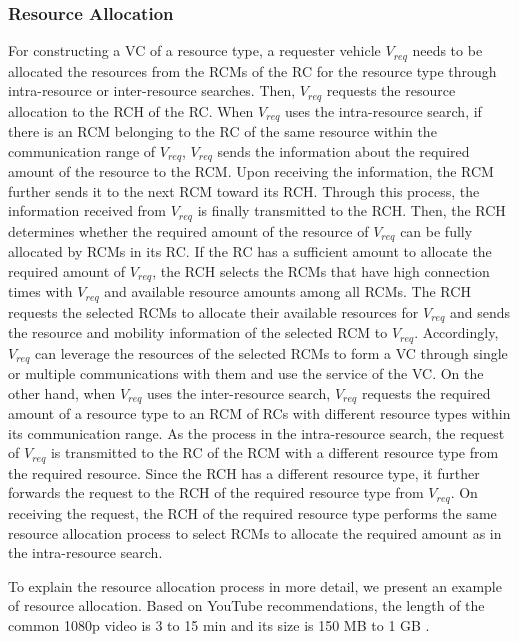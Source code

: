 \documentclass[sensors,article,accept,moreauthors,pdftex]{Definitions/mdpi}
\begin{document}
\subsubsection{Resource Allocation} \label{RA}
For constructing a VC of a resource type, a requester vehicle $V_{req}$ needs to be allocated the resources from the RCMs of the RC for the resource type through intra-resource or inter-resource searches. 
Then, $V_{req}$ requests the resource allocation to the RCH of the RC.
When $V_{req}$ uses the intra-resource search, if there is an RCM belonging to the RC of the same resource within the communication range of $V_{req}$, $V_{req}$ sends the information about the required amount of the resource to the RCM.
Upon receiving the information, the RCM further sends it to the next RCM toward its RCH.
Through this process, the information received from $V_{req}$ is finally transmitted to the RCH. 
Then, the RCH determines whether the required amount of the resource of $V_{req}$ can be fully allocated by RCMs in its RC.
If the RC has a sufficient amount to allocate the required amount of $V_{req}$, the RCH selects the RCMs that have high connection times with $V_{req}$ and available resource amounts among all RCMs.
The RCH requests the selected RCMs to allocate their available resources for $V_{req}$ and sends the resource and mobility information of the selected RCM to $V_{req}$.
Accordingly, $V_{req}$ can leverage the resources of the selected RCMs to form a VC through single or multiple communications with them and use the service of the VC.
On the other hand, when $V_{req}$ uses the inter-resource search, $V_{req}$ requests the required amount of a resource type to an RCM of RCs with different resource types within its communication range.
As the process in the intra-resource search, the request of $V_{req}$ is transmitted to the RC of the RCM with a different resource type from the required resource.
Since the RCH has a different resource type, it further forwards the request to the RCH of the required resource type from $V_{req}$.
On receiving the request, the RCH of the required resource type performs the same resource allocation process to select RCMs to allocate the required amount as in the intra-resource search.

To explain the resource allocation process in more detail, we present an example of resource allocation. Based on YouTube recommendations, the length of the common 1080p video is 3 to 15 min and its size is 150 MB to 1 GB \cite{YouTube}.
\end{document}
